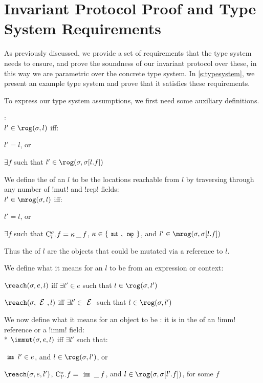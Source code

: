 \section{Invariant Protocol Proof and Type System Requirements}

\lstset{language=FortyFour} %
\label{s:proof}
As previously discussed, we provide a set of requirements that the type system needs to ensure, and prove the soundness of our invariant protocol over these,
in this way we are parametric over the concrete type system. In \autoref{s:typesystem}, we present an example type system and prove that it satisfies these requirements.

To express our type system assumptions, we first need some auxiliary definitions. 
\LS

\noindent {}:\\
\indent $l' \in \rog(\s, l)$ iff:%
\begin{iitemize}
	\item $l' = l$, or\SS
	\item $\exists f$ such that $l' \in \rog(\s, \s[l.f])$
\end{iitemize}

\LS
We define the \mrog of an $l$ to be the locations reachable from $l$ by traversing through any number of \Q!mut! and \Q!rep! fields:\\
\indent $l' \in \mrog(\s, l)$ iff:%
\begin{iitemize}
	\item $l' = l$, or\SS
	\item $\exists f$ such that $\mathrm{C}^{\sigma}_{l}.f = {\kappa}\,\_\,f$, $\fmdf \in \{\Kw{mut},\Kw{rep}\}$, and $l' \in \mrog(\s, \s[l.f])$
\end{iitemize}
Thus the \mrog of $l$ are the objects that could be mutated via a reference to $l$.

\LS
\noindent We define what it means for an $l$ to be \reach from an expression or context:
\begin{iitemize}
\item $\reach(\s, e, l)$ iff $\exists l' \in e$ such that $l \in \rog(\s, l')$\SS
\item $\reach(\s, \E, l)$ iff $\exists l' \in \E$ such that $l \in \rog(\s, l')$
\end{iitemize}

\LS

We now define what it means for an object to be \immut: it is in the \rog of an \Q!imm! reference or a \reach \Q!imm! field:\\*
\indent $\immut(\s, e, l)$ iff $\exists l'$ such that:
\begin{iitemize}
\item $\Kw{imm}\,l' \in e$, and $l \in \rog(\s, l')$, or\SS
\item $\reach(\s, e, l')$, $\C{l'}.f = \field{\Kw{imm}}{\_}{f}$, and $l \in \rog(\s, \s[l'.f])$, for some $f$
\end{iitemize}

